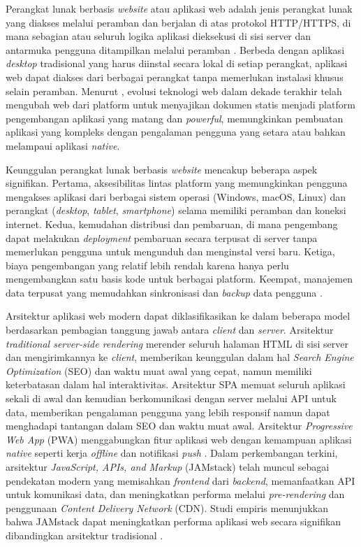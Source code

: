 Perangkat lunak berbasis \textit{website} atau aplikasi web adalah jenis perangkat lunak yang diakses melalui peramban dan berjalan di atas protokol HTTP/HTTPS, di mana sebagian atau seluruh logika aplikasi dieksekusi di sisi server dan antarmuka pengguna ditampilkan melalui peramban \citep{Taivalsaari_2021_WebApps}. Berbeda dengan aplikasi \textit{desktop} tradisional yang harus diinstal secara lokal di setiap perangkat, aplikasi web dapat diakses dari berbagai perangkat tanpa memerlukan instalasi khusus selain peramban. Menurut \citet{Mikkonen_2019_WebPlatformCornucopia}, evolusi teknologi web dalam dekade terakhir telah mengubah web dari platform untuk menyajikan dokumen statis menjadi platform pengembangan aplikasi yang matang dan \textit{powerful}, memungkinkan pembuatan aplikasi yang kompleks dengan pengalaman pengguna yang setara atau bahkan melampaui aplikasi \textit{native}.

Keunggulan perangkat lunak berbasis \textit{website} mencakup beberapa aspek signifikan. Pertama, aksesibilitas lintas platform yang memungkinkan pengguna mengakses aplikasi dari berbagai sistem operasi (Windows, macOS, Linux) dan perangkat (\textit{desktop}, \textit{tablet}, \textit{smartphone}) selama memiliki peramban dan koneksi internet. Kedua, kemudahan distribusi dan pembaruan, di mana pengembang dapat melakukan \textit{deployment} pembaruan secara terpusat di server tanpa memerlukan pengguna untuk mengunduh dan menginstal versi baru. Ketiga, biaya pengembangan yang relatif lebih rendah karena hanya perlu mengembangkan satu basis kode untuk berbagai platform. Keempat, manajemen data terpusat yang memudahkan sinkronisasi dan \textit{backup} data pengguna \citep{Charland_2011_MobileWeb}.

Arsitektur aplikasi web modern dapat diklasifikasikan ke dalam beberapa model berdasarkan pembagian tanggung jawab antara \textit{client} dan \textit{server}. Arsitektur \textit{traditional server-side rendering} merender seluruh halaman HTML di sisi server dan mengirimkannya ke \textit{client}, memberikan keunggulan dalam hal \textit{Search Engine Optimization} (SEO) dan waktu muat awal yang cepat, namun memiliki keterbatasan dalam hal interaktivitas. Arsitektur SPA memuat seluruh aplikasi sekali di awal dan kemudian berkomunikasi dengan server melalui API untuk data, memberikan pengalaman pengguna yang lebih responsif namun dapat menghadapi tantangan dalam SEO dan waktu muat awal. Arsitektur \textit{Progressive Web App} (PWA) menggabungkan fitur aplikasi web dengan kemampuan aplikasi \textit{native} seperti kerja \textit{offline} dan notifikasi \textit{push} \citep{Biorn_2018_PWA}. Dalam perkembangan terkini, arsitektur \textit{JavaScript, APIs, and Markup} (JAMstack) telah muncul sebagai pendekatan modern yang memisahkan \textit{frontend} dari \textit{backend}, memanfaatkan API untuk komunikasi data, dan meningkatkan performa melalui \textit{pre-rendering} dan penggunaan \textit{Content Delivery Network} (CDN). Studi empiris menunjukkan bahwa JAMstack dapat meningkatkan performa aplikasi web secara signifikan dibandingkan arsitektur tradisional \citep{Markovic_2022_JAMstack}.

